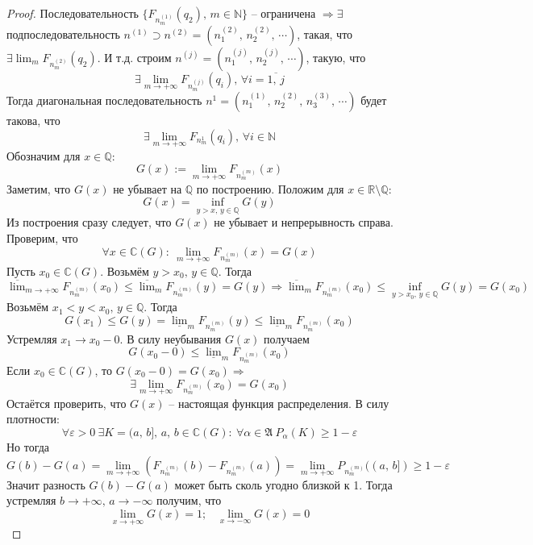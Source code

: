 \begin{proof}
  Последовательность $\{F_{n^{(1)}_m}(q_2),\, m \in \mathbb{N}\}$ -- ограничена $\Rightarrow \exists$ подпоследовательность $n^{(1)} \supset n^{(2)} = (n^{(2)}_1,\,n^{(2)}_2,\,\cdots)$, такая, что $\exists \lim_m F_{n_m^{(2)}}(q_2)$. И т.д. строим $n^{(j)} = (n^{(j)}_1,\,n^{(j)}_2,\,\cdots)$, такую, что 
  \[\exists \lim_{m \to +\infty}F_{n^{(j)}_m}(q_i),\, \forall i = \overline{1,\,j}\]
  Тогда диагональная последовательность $n^1 = (n^{(1)}_1,\,n^{(2)}_2,\, n^{(3)}_3,\,\cdots)$ будет такова, что
  \[\exists \lim_{m \to +\infty}F_{n^1_m}(q_i),\, \forall i \in \mathbb{N}\]
  Обозначим для $x \in \mathbb{Q}$:
  \[G(x) := \lim_{m \to +\infty}F_{n^{(m)}_m}(x)\]
  Заметим, что $G(x)$ не убывает на $\mathbb{Q}$ по построению. Положим для $x \in \mathbb{R} \setminus \mathbb{Q}$:
  \[G(x) = \inf_{y > x,\, y \in \mathbb{Q}}G(y)\]
  Из построения сразу следует, что $G(x)$ не убывает и непрерывность справа. Проверим, что 
  \[\forall x \in \mathbb{C}(G):\: \lim_{m \to +\infty}F_{n^{(m)}_m}(x) = G(x)\]
  Пусть $x_0 \in \mathbb{C}(G)$. Возьмём $y > x_0,\, y \in \mathbb{Q}$. Тогда
  \[\overline{\lim}_{m \to +\infty}F_{n^{(m)}_m}(x_0) \leq \overline{\lim}_mF_{n^{(m)}_m}(y) = G(y) \Rightarrow \overline{\lim}_m F_{n^{(m)}_m}(x_0) \leq \inf_{y > x_0,\, y \in \mathbb{Q}}G(y) = G(x_0)\]
  Возьмём $x_1 < y < x_0,\, y \in \mathbb{Q}$. Тогда
  \[G(x_1) \leq G(y) = \underline{\lim}_mF_{n^{(m)}_m}(y) \leq \underline{\lim}_m F_{n^{(m)}_m}(x_0)\]
  Устремляя $x_1 \to x_0 - 0$. В силу неубывания $G(x)$ получаем
  \[G(x_0 - 0) \leq \underline{\lim}_m F_{n^{(m)}_m}(x_0)\]
  Если $x_0 \in \mathbb{C}(G)$, то $G(x_0 - 0) = G(x_0) \Rightarrow$
  \[\exists \lim_{m \to +\infty}F_{n^{(m)}_m}(x_0) = G(x_0)\]
  Остаётся проверить, что $G(x)$ -- настоящая функция распределения. В силу плотности:
  \[\forall \varepsilon > 0 \: \exists K = (a,\,b],\, a,\, b \in \mathbb{C}(G):\: \forall \alpha \in \mathfrak{A} \: P_\alpha(K) \geq 1 - \varepsilon\]
  Но тогда
  \[G(b) - G(a) = \lim_{m \to +\infty}\left(F_{n^{(m)}_m}(b) - F_{n^{(m)}_m}(a)\right) = \lim_{m \to +\infty} P_{n^{(m)}_m}((a,\,b]) \geq 1 - \varepsilon\]
  Значит разность $G(b) - G(a)$ может быть сколь угодно близкой к 1. Тогда устремляя $b \to +\infty,\, a \to -\infty$ получим, что
  \[\lim_{x \to +\infty}G(x) = 1;\;\;\; \lim_{x \to -\infty}G(x) = 0\]
\end{proof}
